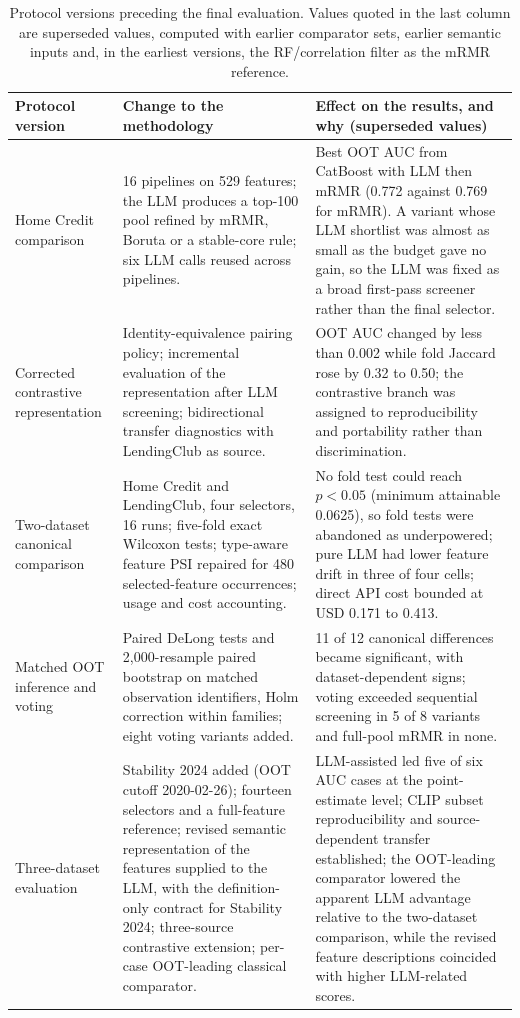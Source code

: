 \documentclass[final,5p,twocolumn]{elsarticle}
\begin{document}
\begin{table}[htbp]
\centering
\footnotesize
\setlength{\tabcolsep}{5pt}
\begin{threeparttable}
\caption{Protocol versions preceding the final evaluation. Values quoted in the last column are superseded values, computed with earlier comparator sets, earlier semantic inputs and, in the earliest versions, the RF/correlation filter as the mRMR reference.}
\label{tab:stages}
\begin{tabular}{@{}L{27mm}L{\dimexpr(\textwidth-27mm-4\tabcolsep)/2\relax}L{\dimexpr(\textwidth-27mm-4\tabcolsep)/2\relax}@{}}
\toprule
Protocol version & Change to the methodology & Effect on the results, and why (superseded values) \\
\midrule
Home Credit comparison & 16 pipelines on 529 features; the LLM produces a top-100 pool refined by mRMR, Boruta or a stable-core rule; six LLM calls reused across pipelines. & Best OOT AUC from CatBoost with LLM then mRMR (0.772 against 0.769 for mRMR). A variant whose LLM shortlist was almost as small as the budget gave no gain, so the LLM was fixed as a broad first-pass screener rather than the final selector. \\
\addlinespace
Corrected contrastive representation & Identity-equivalence pairing policy; incremental evaluation of the representation after LLM screening; bidirectional transfer diagnostics with LendingClub as source. & OOT AUC changed by less than 0.002 while fold Jaccard rose by 0.32 to 0.50; the contrastive branch was assigned to reproducibility and portability rather than discrimination. \\
\addlinespace
Two-dataset canonical comparison & Home Credit and LendingClub, four selectors, 16 runs; five-fold exact Wilcoxon tests; type-aware feature PSI repaired for 480 selected-feature occurrences; usage and cost accounting. & No fold test could reach $p<0.05$ (minimum attainable 0.0625), so fold tests were abandoned as underpowered; pure LLM had lower feature drift in three of four cells; direct API cost bounded at USD 0.171 to 0.413. \\
\addlinespace
Matched OOT inference and voting & Paired DeLong tests and 2,000-resample paired bootstrap on matched observation identifiers, Holm correction within families; eight voting variants added. & 11 of 12 canonical differences became significant, with dataset-dependent signs; voting exceeded sequential screening in 5 of 8 variants and full-pool mRMR in none. \\
\addlinespace
Three-dataset evaluation & Stability 2024 added (OOT cutoff 2020-02-26); fourteen selectors and a full-feature reference; revised semantic representation of the features supplied to the LLM, with the definition-only contract for Stability 2024; three-source contrastive extension; per-case OOT-leading classical comparator. & LLM-assisted led five of six AUC cases at the point-estimate level; CLIP subset reproducibility and source-dependent transfer established; the OOT-leading comparator lowered the apparent LLM advantage relative to the two-dataset comparison, while the revised feature descriptions coincided with higher LLM-related scores. \\

\end{tabular}
\end{threeparttable}
\end{table}
\end{document}
